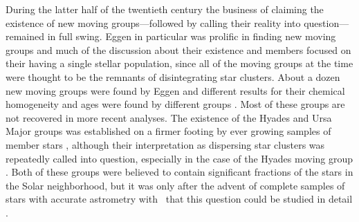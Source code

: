 During the latter half of the twentieth century the business of
claiming the existence of new moving groups---followed by calling
their reality into question---remained in full swing. Eggen in
particular was prolific in finding new moving groups and much of the
discussion about their existence and members focused on their having a
single stellar population, since all of the moving groups at the time
were thought to be the remnants of disintegrating star clusters. About
a dozen new moving groups were found by Eggen
\citep{1958MNRAS.118..154E,1959MNRAS.119..255E,1959Obs....79..182E,1959Obs....79...88E,1964RGOB...84..111E,1965Obs....85..191E,1969PASP...81..553E,1971PASP...83..271E,1971PASP...83..251E,1978ApJ...222..203E}
and different results for their chemical homogeneity and ages were
found by different groups
\citep[\eg,][]{1970PASP...82...99E,1971MNRAS.153..171W,1975PASP...87...17B,1979LIACo..22..355T,1983AJ.....88..813E,1983MNRAS.204..841M,1986AJ.....92..910E,1988Ap&SS.145...61P}. Most
of these groups are not recovered in more recent analyses. The
existence of the Hyades and Ursa Major groups was established on a
firmer footing by ever growing samples of member stars
\citep{1968SvA....12..279O,1970SvA....13..934O,1970PASP...82...99E,1975PASP...87...17B,1993AJ....105..226S},
although their interpretation as dispersing star clusters was
repeatedly called into question, especially in the case of the Hyades
moving group
\citep{1966Sci...151.1487W,1968PASP...80..578B,1971MNRAS.153..171W,1975PASP...87...17B,1987AJ.....93..920S,1988ApJ...332..410B}. Both
of these groups were believed to contain significant fractions of the
stars in the Solar neighborhood, but it was only after the advent of
complete samples of stars with accurate astrometry with \Hipparcos\
that this question could be studied in detail \citep[with the
exception of][]{1985A&A...145..331G,1990A&A...236...95G}.



